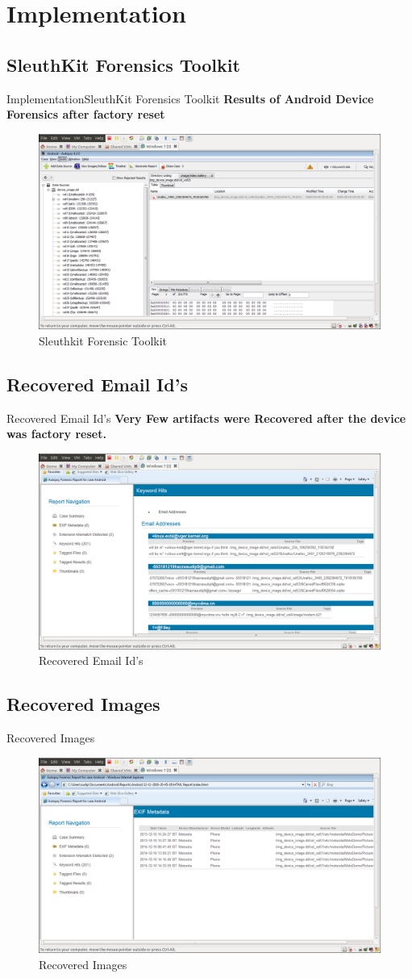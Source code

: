 \documentclass{beamer}
\begin{document}
\section{Implementation}
\subsection{SleuthKit Forensics Toolkit}
\begin{frame}{Implementation}{SleuthKit Forensics Toolkit}
\textbf{Results of Android Device Forensics after factory reset}
\begin{figure}
\centering

\includegraphics[width=.5\textwidth,height=.5\textheight]{images/sleuthkit}
\caption{Sleuthkit Forensic Toolkit}
\label{imageLabel}

\end{figure}



\end{frame}
\subsection{Recovered Email Id's}
\begin{frame}{Recovered Email Id's}
\textbf{Very Few artifacts were Recovered after the device was factory reset.}
\begin{figure}
\includegraphics[width=.5\textwidth,height=.5\textheight]{images/emails}
\caption{Recovered Email Id's}
\end{figure}
\end{frame}
\subsection{Recovered Images}
\begin{frame}{Recovered Images}
\begin{figure}
\includegraphics[width=.5\textwidth,height=.5\textheight]{images/exitmetadata}
\caption{Recovered Images}
\end{figure}
\end{frame}
\end{document}
